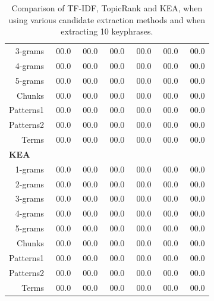\begin{table}[h]
\begin{tabular}{@{~}r@{~~}c@{~~}c@{~~}c@{~~}c@{~~}c@{~~}c@{~}}
        3-grams & ${~~}$00.0 & ${~~}$00.0 & ${~~}$00.0 & ${~~}$00.0 & ${~~}$00.0 & ${~~}$00.0\\
        4-grams & ${~~}$00.0 & ${~~}$00.0 & ${~~}$00.0 & ${~~}$00.0 & ${~~}$00.0 & ${~~}$00.0\\
        5-grams & ${~~}$00.0 & ${~~}$00.0 & ${~~}$00.0 & ${~~}$00.0 & ${~~}$00.0 & ${~~}$00.0\\
        Chunks & ${~~}$00.0 & ${~~}$00.0 & ${~~}$00.0 & ${~~}$00.0 & ${~~}$00.0 & ${~~}$00.0\\
        Patterns1 & ${~~}$00.0 & ${~~}$00.0 & ${~~}$00.0 & ${~~}$00.0 & ${~~}$00.0 & ${~~}$00.0\\
        Patterns2 & ${~~}$00.0 & ${~~}$00.0 & ${~~}$00.0 & ${~~}$00.0 & ${~~}$00.0 & ${~~}$00.0\\
        Terms & ${~~}$00.0 & ${~~}$00.0 & ${~~}$00.0 & ${~~}$00.0 & ${~~}$00.0 & ${~~}$00.0\\
        \multicolumn{1}{l}{\textbf{KEA}}\\
        1-grams & ${~~}$00.0 & ${~~}$00.0 & ${~~}$00.0 & ${~~}$00.0 & ${~~}$00.0 & ${~~}$00.0\\
        2-grams & ${~~}$00.0 & ${~~}$00.0 & ${~~}$00.0 & ${~~}$00.0 & ${~~}$00.0 & ${~~}$00.0\\
        3-grams & ${~~}$00.0 & ${~~}$00.0 & ${~~}$00.0 & ${~~}$00.0 & ${~~}$00.0 & ${~~}$00.0\\
        4-grams & ${~~}$00.0 & ${~~}$00.0 & ${~~}$00.0 & ${~~}$00.0 & ${~~}$00.0 & ${~~}$00.0\\
        5-grams & ${~~}$00.0 & ${~~}$00.0 & ${~~}$00.0 & ${~~}$00.0 & ${~~}$00.0 & ${~~}$00.0\\
        Chunks & ${~~}$00.0 & ${~~}$00.0 & ${~~}$00.0 & ${~~}$00.0 & ${~~}$00.0 & ${~~}$00.0\\
        Patterns1 & ${~~}$00.0 & ${~~}$00.0 & ${~~}$00.0 & ${~~}$00.0 & ${~~}$00.0 & ${~~}$00.0\\
        Patterns2 & ${~~}$00.0 & ${~~}$00.0 & ${~~}$00.0 & ${~~}$00.0 & ${~~}$00.0 & ${~~}$00.0\\
        Terms & ${~~}$00.0 & ${~~}$00.0 & ${~~}$00.0 & ${~~}$00.0 & ${~~}$00.0 & ${~~}$00.0\\
        \bottomrule
      \end{tabular}
      \caption{Comparison of TF-IDF, TopicRank and KEA, when using various
               candidate extraction methods and when extracting 10 keyphrases.
               \label{tab:keyphrase_extraction_results}}
    \end{table}

